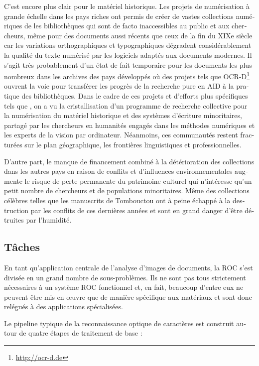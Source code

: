 \begin{french}
C'est encore plus clair pour le matériel historique. Les projets de
numérisation à grande échelle dans les pays riches ont permis de créer de
vastes collections numériques de les bibliothèques qui sont de facto
inaccessibles au public et aux chercheurs, même pour des documents aussi
récents que ceux de la fin du XIXe siècle car les variations orthographiques et
typographiques dégradent considérablement la qualité du texte numérisé par les
logiciels adaptés aux documents modernes. Il s'agit très probablement d'un état
de fait temporaire pour les documents les plus nombreux dans les archives des
pays développés où des projets tels que OCR-D\footnote{\url{http://ocr-d.de}}
ouvrent la voie pour transférer les progrès de la recherche pure en AID à la
pratique des bibliothèques. Dans le cadre de ces projets et d'efforts plus
spécifiques tels que \cite{smith2018research}, on a vu la cristallisation d'un
programme de recherche collective pour la numérisation du matériel historique
et des systèmes d'écriture minoritaires, partagé par les chercheurs en 
humanités engagés dans les méthodes numériques et les experts de la vision par
ordinateur. Néanmoins, ces communautés restent fracturées sur le plan
géographique, les frontières linguistiques et professionnelles.

D'autre part, le manque de financement combiné à la détérioration des
collections dans les autres pays en raison de conflits et d'influences
environnementales augmente le risque de perte permanente du patrimoine culturel
qui n'intéresse qu'un petit nombre de chercheurs et de populations
minoritaires. Même des collections célèbres telles que les manuscrits de
Tombouctou ont à peine échappé à la destruction par les conflits de ces
dernières années et sont en grand danger d'être détruites par l'humidité. 

\subsection{Tâches}

En tant qu'application centrale de l'analyse d'images de documents, la ROC
s'est divisée en un grand nombre de sous-problèmes. Ils ne sont pas tous
strictement nécessaires à un système ROC fonctionnel et, en fait, beaucoup
d'entre eux ne peuvent être mis en œuvre que de manière spécifique aux
matériaux et sont donc relégués à des applications spécialisées.

Le pipeline typique de la reconnaissance optique de caractères est construit
autour de quatre étapes de traitement de base :


\end{french}
